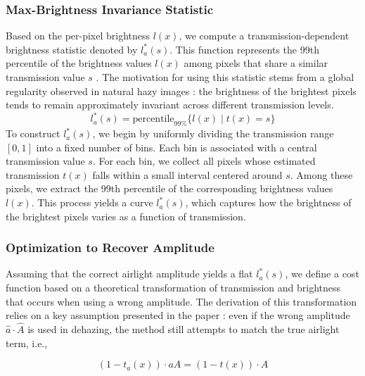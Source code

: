 \documentclass[conference]{IEEEtran}
\begin{document}




\subsubsection{Max-Brightness Invariance Statistic}
Based on the per-pixel brightness \( l(x) \), we compute a transmission-dependent brightness statistic denoted by \( l^*_a(s) \). This function represents the 99th percentile of the brightness values \( l(x) \) among pixels that share a similar transmission value \( s \) \cite{airlight}. The motivation for using this statistic stems from a global regularity observed in natural hazy images \cite{airlight}: the brightness of the brightest pixels tends to remain approximately invariant across different transmission levels.
\begin{equation}
\label{brightness_statistic}
l^*_a(s) = \text{percentile}_{99\%} \{ l(x) \mid t(x) = s \}
\end{equation}
To construct \( l^*_a(s) \), we begin by uniformly dividing the transmission range \([0, 1]\) into a fixed number of bins. Each bin is associated with a central transmission value \( s \). For each bin, we collect all pixels whose estimated transmission \( t(x) \) falls within a small interval centered around \( s \). Among these pixels, we extract the 99th percentile of the corresponding brightness values \( l(x) \). This process yields a curve \( l^*_a(s) \), which captures how the brightness of the brightest pixels varies as a function of transmission.

\subsubsection{Optimization to Recover Amplitude}

Assuming that the correct airlight amplitude yields a flat \( l^*_a(s) \), we define a cost function based on a theoretical transformation of transmission and brightness that occurs when using a wrong amplitude. The derivation of this transformation relies on a key assumption presented in the paper \cite{airlight} : even if the wrong amplitude \( \hat{a} \cdot \hat{A}\) is used in dehazing, the method still attempts to match the true airlight term, i.e.,

\begin{equation}
\label{matching_airlight}
(1 - t_a(x)) \cdot aA = (1 - t(x)) \cdot A
\end{equation}
\end{document}
